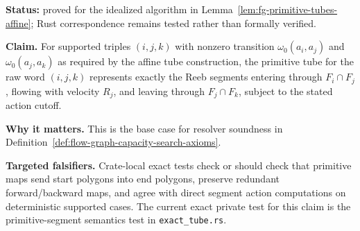 \begin{unverified}
\begin{remark}%
\label{rem:fg-pr-primitive-tube-soundness}
\textbf{Status:} proved for the idealized algorithm in
Lemma~\ref{lem:fg-primitive-tubes-affine}; Rust correspondence remains tested
rather than formally verified.

\textbf{Claim.}  For supported triples $(i,j,k)$ with nonzero transition
$\omega_0(a_i,a_j)$ and $\omega_0(a_j,a_k)$ as required by the affine tube
construction, the primitive tube for the raw word $(i,j,k)$ represents exactly
the Reeb segments entering through $F_i\cap F_j$, flowing with velocity $R_j$,
and leaving through $F_j\cap F_k$, subject to the stated action cutoff.

\textbf{Why it matters.}  This is the base case for resolver soundness in
Definition~\ref{def:flow-graph-capacity-search-axioms}.

\textbf{Targeted falsifiers.}  Crate-local exact tests check or should check
that primitive maps send start polygons into end polygons, preserve redundant
forward/backward maps, and agree with direct segment action computations on
deterministic supported cases.  The current exact private test for this claim is
the primitive-segment semantics test in \texttt{exact\_tube.rs}.
\end{remark}
\end{unverified}

